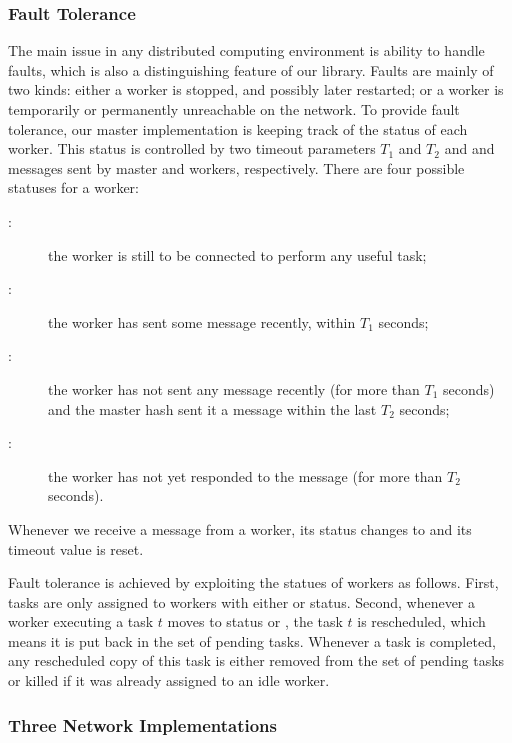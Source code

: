 \documentclass[preprint]{sigplanconf}
\begin{document}
\subsubsection{Fault Tolerance}\label{sec:fault}

The main issue in any distributed computing environment is ability to
handle faults, which is also a distinguishing feature of our library.
Faults are mainly of two kinds: either a worker is stopped, and
possibly later restarted; or a worker is temporarily or permanently
unreachable on the network. To provide fault tolerance, our master
implementation is keeping track of the status of each worker. 
This status is controlled by two timeout parameters $T_1$ and $T_2$
and  and  messages sent by master and workers,
respectively. There are four possible statuses for a worker: 
\begin{description}
\item[:] the worker is still to be
  connected to perform any useful task;
\item[:] the worker has sent some message recently,
  within $T_1$ seconds;
\item[:] the worker has not sent any message recently (for more
  than $T_1$ seconds) and the master hash sent it a  message
  within the last $T_2$ seconds;
\item[:] the worker has not yet responded to the 
  message (for more than $T_2$ seconds).
\end{description}
Whenever we receive a message from a worker, its status changes to
 and its timeout value is reset.

Fault tolerance is achieved by exploiting the statues of workers as
follows. First, tasks are only assigned to workers with either
 or  status. Second, whenever a worker executing
a task $t$ moves to status  or , the
task $t$ is rescheduled, which means it is put back in the set of
pending tasks. Whenever a task is completed, any rescheduled copy of
this task is either removed from the set of pending tasks or killed if
it was already assigned to an idle worker.

\subsubsection{Three Network Implementations} %
\end{document}
